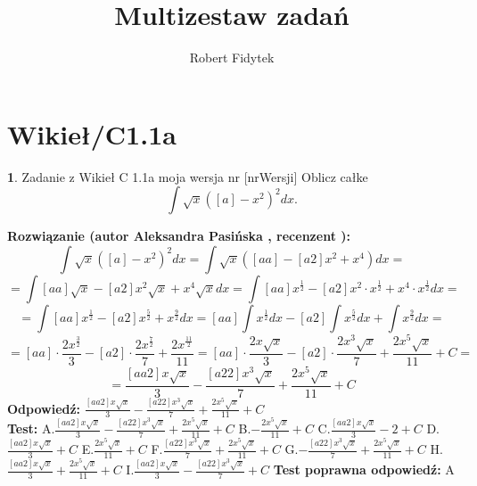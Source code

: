 \documentclass[12pt, a4paper]{article}
\title{Multizestaw zadań}
\author{Robert Fidytek}
\date{}
\theoremstyle{definition} %
\newtheorem{zad}{}
\newcommand{\kategoria}[1]{\section{#1}} %
\newcommand{\zadStart}[1]{\begin{zad}#1\newline} %
\newcommand{\zadStop}{\end{zad}}   %
\newcommand{\rozwStart}[2]{\noindent \textbf{Rozwiązanie (autor #1 , recenzent #2): }\newline} %
\newcommand{\rozwStop}{\newline}                                            %
\newcommand{\odpStart}{\noindent \textbf{Odpowiedź:}\newline}    %
\newcommand{\odpStop}{\newline}                                             %
\newcommand{\testStart}{\noindent \textbf{Test:}\newline} %
\newcommand{\testStop}{\newline} %
\newcommand{\kluczStart}{\noindent \textbf{Test poprawna odpowiedź:}\newline} %
\newcommand{\kluczStop}{\newline} %
\begin{document}
\maketitle


\kategoria{Wikieł/C1.1a}
\zadStart{Zadanie z Wikieł C 1.1a moja wersja nr [nrWersji]}
Oblicz całke $$\int \sqrt{x}([a]-x^2)^2dx.$$
\zadStop
\rozwStart{Aleksandra Pasińska}{}
$$\int \sqrt{x}([a]-x^2)^2dx=\int \sqrt{x}([aa]-[a2]x^2+x^4)dx=$$
$$=\int[aa]\sqrt{x}-[a2]x^2\sqrt{x}+x^4\sqrt{x}dx=\int[aa]x^{\frac{1}{2}}-[a2]x^2\cdot x^{\frac{1}{2}}+x^4\cdot x^{\frac{1}{2}}dx=$$ 
$$=\int[aa]x^{\frac{1}{2}}-[a2]x^{\frac{5}{2}}+x^{\frac{9}{2}}dx=[aa]\int x^\frac{1}{2}dx-[a2]\int x^\frac{5}{2}dx+\int x^\frac{9}{2}dx=$$
$$=[aa]\cdot \frac{2x^{\frac{3}{2}}}{3}-[a2]\cdot \frac{2x^{\frac{7}{2}}}{7}+\frac{2x^{\frac{11}{2}}}{11}=[aa]\cdot \frac{2x\sqrt{x}}{3}-[a2]\cdot \frac{2x^3\sqrt{x}}{7}+\frac{2x^5\sqrt{x}}{11}+C=$$
$$= \frac{[aa2]x\sqrt{x}}{3}-\frac{[a22]x^3\sqrt{x}}{7}+\frac{2x^5\sqrt{x}}{11}+C$$
\rozwStop
\odpStart
$\frac{[aa2]x\sqrt{x}}{3}-\frac{[a22]x^3\sqrt{x}}{7}+\frac{2x^5\sqrt{x}}{11}+C$\\
\odpStop
\testStart
A.$\frac{[aa2]x\sqrt{x}}{3}-\frac{[a22]x^3\sqrt{x}}{7}+\frac{2x^5\sqrt{x}}{11}+C$
B.$-\frac{2x^5\sqrt{x}}{11}+C$
C.$\frac{[aa2]x\sqrt{x}}{3}-2+C$
D.$\frac{[aa2]x\sqrt{x}}{3}+C$
E.$\frac{2x^5\sqrt{x}}{11}+C$
F.$\frac{[a22]x^3\sqrt{x}}{7}+\frac{2x^5\sqrt{x}}{11}+C$
G.$-\frac{[a22]x^3\sqrt{x}}{7}+\frac{2x^5\sqrt{x}}{11}+C$
H.$\frac{[aa2]x\sqrt{x}}{3}+\frac{2x^5\sqrt{x}}{11}+C$
I.$\frac{[aa2]x\sqrt{x}}{3}-\frac{[a22]x^3\sqrt{x}}{7}+C$
\testStop
\kluczStart
A
\kluczStop
\end{document}
